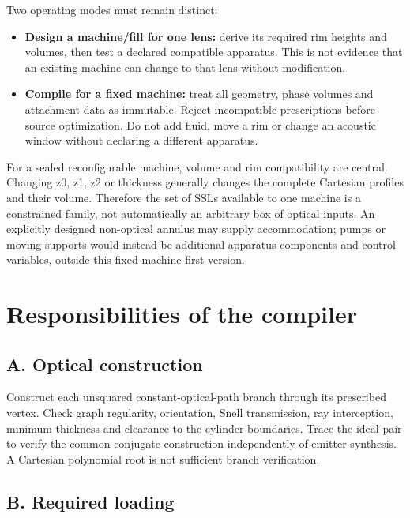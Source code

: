 Two operating modes must remain distinct:

\begin{itemize}
\tightlist
\item
  \textbf{Design a machine/fill for one lens:} derive its required rim
  heights and volumes, then test a declared compatible apparatus. This
  is not evidence that an existing machine can change to that lens
  without modification.
\item
  \textbf{Compile for a fixed machine:} treat all geometry, phase
  volumes and attachment data as immutable. Reject incompatible
  prescriptions before source optimization. Do not add fluid, move a rim
  or change an acoustic window without declaring a different apparatus.
\end{itemize}

For a sealed reconfigurable machine, volume and rim compatibility are
central. Changing z0, z1, z2 or thickness generally changes the complete
Cartesian profiles and their volume. Therefore the set of SSLs available
to one machine is a constrained family, not automatically an arbitrary
box of optical inputs. An explicitly designed non-optical annulus may
supply accommodation; pumps or moving supports would instead be
additional apparatus components and control variables, outside this
fixed-machine first version.

\section{Responsibilities of the compiler}\label{responsibilities-of-the-compiler}

\subsection{A. Optical construction}\label{a.-optical-construction}

Construct each unsquared constant-optical-path branch through its
prescribed vertex. Check graph regularity, orientation, Snell
transmission, ray interception, minimum thickness and clearance to the
cylinder boundaries. Trace the ideal pair to verify the common-conjugate
construction independently of emitter synthesis. A Cartesian polynomial
root is not sufficient branch verification.

\subsection{B. Required loading}\label{b.-required-loading}

